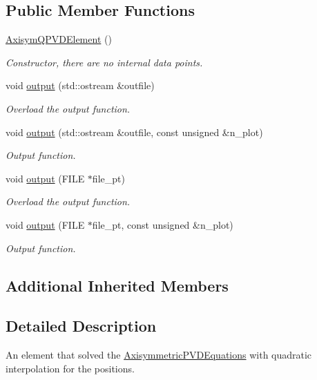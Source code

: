 \subsection*{Public Member Functions}
\begin{DoxyCompactItemize}
\item 
\hyperlink{classoomph_1_1AxisymQPVDElement_a0cd0c4e03f099140ce3655fcab3c3ef3}{Axisym\+Q\+P\+V\+D\+Element} ()
\begin{DoxyCompactList}\small\item\em Constructor, there are no internal data points. \end{DoxyCompactList}\item 
void \hyperlink{classoomph_1_1AxisymQPVDElement_ac2a240575dea087098520bf6f9567dc2}{output} (std\+::ostream \&outfile)
\begin{DoxyCompactList}\small\item\em Overload the output function. \end{DoxyCompactList}\item 
void \hyperlink{classoomph_1_1AxisymQPVDElement_ab9925995ad1b184df43b6eb350f3e0bd}{output} (std\+::ostream \&outfile, const unsigned \&n\+\_\+plot)
\begin{DoxyCompactList}\small\item\em Output function. \end{DoxyCompactList}\item 
void \hyperlink{classoomph_1_1AxisymQPVDElement_abc2012c37faa9153f18fab2ff273bc9a}{output} (F\+I\+LE $\ast$file\+\_\+pt)
\begin{DoxyCompactList}\small\item\em Overload the output function. \end{DoxyCompactList}\item 
void \hyperlink{classoomph_1_1AxisymQPVDElement_afcd700bebcd0e1c83066da66804785c9}{output} (F\+I\+LE $\ast$file\+\_\+pt, const unsigned \&n\+\_\+plot)
\begin{DoxyCompactList}\small\item\em Output function. \end{DoxyCompactList}\end{DoxyCompactItemize}
\subsection*{Additional Inherited Members}


\subsection{Detailed Description}
An element that solved the \hyperlink{classoomph_1_1AxisymmetricPVDEquations}{Axisymmetric\+P\+V\+D\+Equations} with quadratic interpolation for the positions. 

